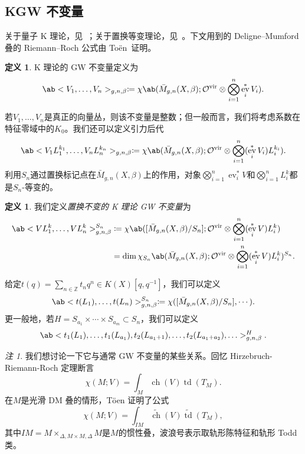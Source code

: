 \documentclass{amsart}
\theoremstyle{definition}
\newtheorem{defn}[thm]{定义}
\theoremstyle{remark}
\newtheorem{rmk}[thm]{注}
\theoremstyle{plain}
\theoremstyle{definition}
\theoremstyle{remark}
\newcommand{\Z}{\mathbb{Z}}
\newcommand{\mc}[1]{\mathcal{#1}}
\newcommand{\mr}[1]{\mathrm{#1}}
\newcommand{\on}[1]{\operatorname{#1}}
\newcommand{\wt}[1]{\widetilde{#1}}
\newcommand{\1}{\mathbf{1}}
\newcommand{\2}{\mathbf{2}}
\newcommand{\3}{\mathbf{3}}
\newcommand{\vir}{\mr{vir}}
\DeclareMathOperator{\ev}{ev}
\begin{document}
\subsection{KGW 不变量}%
\label{sub:KGW invariants}

关于量子 K 理论，见~\cite{Lee2004}；关于置换等变理论，见~\cite{Givental2017K1,GiventalK7}。下文用到的 Deligne--Mumford 叠的 Riemann--Roch 公式由 To\"en~\cite{Toen1999}证明。

\begin{defn}
    K 理论的 GW 不变量定义为
    \[ \ab<V_1, \ldots, V_n>_{g,n,\beta} \coloneqq \chi\ab(\bar{M}_{g,n}(X, \beta); \mc{O}^{\vir} \otimes \bigotimes_{i=1}^n \ev_i^* V_i). \]
\end{defn}

若\(V_1, \ldots, V_n\)是真正的向量丛，则该不变量是整数；但一般而言，我们将考虑系数在特征零域中的\(K_0\)。我们还可以定义引力后代
\[ \ab<V_1 L_1^{k_1}, \ldots, V_n L_n^{k_n}>_{g,n,\beta} \coloneqq \chi\ab(\bar{M}_{g,n}(X, \beta); \mc{O}^{\vir} \otimes \bigotimes_{i=1}^n ( \ev_i^* V_i )L_i^{k_i} ). \]
利用\(S_n\)通过置换标记点在\(\bar{M}_{g,n}(X, \beta)\)上的作用，对象\(\bigotimes_{i=1}^n \ev_i^* V\)和\(\bigotimes_{i=1}^n L_i^k\)都是\(S_n\)-等变的。

\begin{defn}
    我们定义\textit{置换不变的 K 理论 GW 不变量}为
    \begin{align*}
        \ab<V L_1^k, \ldots, V L_n^k>_{g,n,\beta}^{S_n} &\coloneqq \chi\ab([ \bar{M}_{g,n}(X, \beta)/S_n ]; \mc{O}^{\vir} \otimes \bigotimes_{i=1}^n ( \ev_i^* V ) L_i^k) \\
        &= \dim \chi_{S_n} \ab(\bar{M}_{g,n}(X, \beta); \mc{O}^{\vir} \otimes \bigotimes_{i=1}^n ( \ev_i^* V ) L_i^k )^{S_n}.
    \end{align*}
\end{defn}

给定\(t(q) = \sum_{n \in \Z} t_n q^n \in K(X)[q,q^{-1}]\)，我们可以定义
\[ \ab< t(L_1), \ldots, t(L_n)>^{S_n}_{g,n,\beta} \coloneqq \chi ([\bar{M}_{g,n}(X,\beta)/S_n], \cdots). \]
更一般地，若\(H = S_{a_1} \times \cdots \times S_{a_m} \subset S_n\)，我们可以定义
\[ \ab<t_1(L_1), \ldots, t_1(L_{a_1}), t_2(L_{a_1+1}), \ldots, t_2(L_{a_1+a_2}), \ldots>_{g,n,\beta}^H. \]

\begin{rmk}
    我们想讨论一下它与通常 GW 不变量的某些关系。回忆 Hirzebruch-Riemann-Roch 定理断言
    \[ \chi(M; V) = \int_M \on{ch}(V) \on{td}(T_M). \]
    在\(M\)是光滑 DM 叠的情形，T\"oen 证明了公式
    \[ \chi(M; V) = \int_{IM} \wt{\on{ch}}(V) \wt{\on{td}}(T_M), \]
    其中\(IM = M \times_{\Delta, M \times M, \Delta} M\)是\(M\)的惯性叠，波浪号表示取轨形陈特征和轨形 Todd 类。
\end{rmk}
\end{document}
